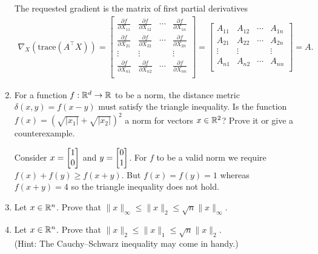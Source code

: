 \begin{enumerate}[label=(\alph*)]
\begin{mdframed}
      The requested gradient is the matrix of first partial derivatives
      \begin{align*}
        \nabla_X (\text{trace}(A^{\top}X)) =
        \begin{bmatrix}
          \frac{\partial f}{\partial X_{11}} & \frac{\partial f}{\partial X_{12}} & \cdots & \frac{\partial f}{\partial X_{1n}} \\
          \frac{\partial f}{\partial X_{21}} & \frac{\partial f}{\partial X_{22}} & \cdots & \frac{\partial f}{\partial X_{2n}} \\
          \vdots                            & \vdots                             &        & \vdots                             \\
          \frac{\partial f}{\partial X_{n1}} & \frac{\partial f}{\partial X_{n2}} & \cdots & \frac{\partial f}{\partial X_{nn}} \\
        \end{bmatrix}
        =
        \begin{bmatrix}
          A_{11}  & A_{12} & \cdots & A_{1n} \\
          A_{21}  & A_{22} & \cdots & A_{2n} \\
          \vdots & \vdots &        & \vdots \\
          A_{n1}  & A_{n2} & \cdots & A_{nn} \\
        \end{bmatrix}
        = A.
      \end{align*}
    \end{mdframed}

    \item For a function $f: \mathbb{R}^d \rightarrow \mathbb{R}$ to be a norm, the distance metric $\delta(x, y) = f(x-y)$  must satisfy the triangle inequality. Is the function $f(x) = (\sqrt{|x_1|} + \sqrt{|x_2|})^2$ a norm for vectors $x \in \mathbb{R}^2$? Prove it or give a counterexample.
    \begin{mdframed}
      Consider $x = \begin{bmatrix}1\\0\end{bmatrix}$ and $y = \begin{bmatrix}0\\1\end{bmatrix}$. For $f$ to be a valid
      norm we require $f(x) + f(y) \geq f(x + y)$. But $f(x) = f(y) = 1$
      whereas $f(x + y) = 4$ so the triangle inequality does not hold.
    \end{mdframed}

    \item Let $x \in \mathbb{R}^n$. Prove that $\lVert x \rVert_{\infty} \leq \lVert x\rVert_2 \leq \sqrt{n} \lVert x \rVert_{\infty}$.
    \begin{mdframed} \solution
    \end{mdframed}

    \item Let $x \in \mathbb{R}^n$. Prove that $\lVert x \rVert_2 \leq \lVert x \rVert_1 \leq \sqrt{n} \lVert x \rVert_2$. \\
    (Hint: The Cauchy–Schwarz inequality may come in handy.)
    \begin{mdframed} \solution
    \end{mdframed}

\end{enumerate}

